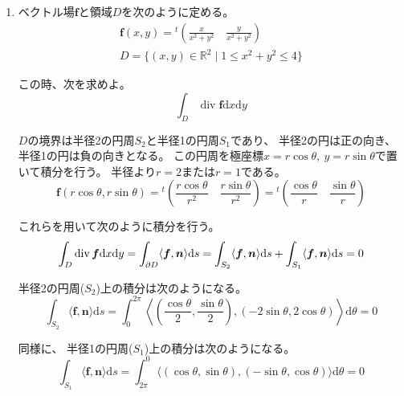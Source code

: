 \documentclass[12pt,b5paper]{ltjsarticle}
\newcommand{\Div}{\mathop{\mathrm{div}}\nolimits}
\begin{document}
\begin{enumerate}
 \item
      ベクトル場$\bm{f}$と領域$D$を次のように定める。
      \begin{gather}
       \bm{f}(x,y) = {}^{t}\left(\frac{x}{x^2+y^2} \quad  \frac{y}{x^2+y^2}\right)\\
       D = \{ (x,y)\in\mathbb{R}^2 \mid 1\leq  x^2+y^2\leq 4 \}
      \end{gather}

      この時、次を求めよ。
      \begin{equation}
       \int_D \Div\bm{f} \mathrm{d}x\mathrm{d}y
      \end{equation}

\dotfill

      $D$の境界は半径2の円周$S_2$と半径1の円周$S_1$であり、
      半径2の円は正の向き、半径1の円は負の向きとなる。
      この円周を極座標$x=r\cos\theta,\ y=r\sin\theta$で置いて積分を行う。
      半径より$r=2$または$r=1$である。
      \begin{equation}
       \bm{f}(r\cos\theta,r\sin\theta)
        = {}^{t}\left(\frac{r\cos\theta}{r^2} \quad  \frac{r\sin\theta}{r^2}\right)
        = {}^{t}\left(\frac{\cos\theta}{r} \quad  \frac{\sin\theta}{r}\right)
      \end{equation}

      これらを用いて次のように積分を行う。
      \begin{equation}
       \int_D \Div\bm{f} \mathrm{d}x\mathrm{d}y
       = \int_{\partial D} \langle \bm{f}, \bm{n} \rangle \mathrm{d}s
       = \int_{S_2} \langle \bm{f}, \bm{n} \rangle \mathrm{d}s
         + \int_{S_1} \langle \bm{f}, \bm{n} \rangle \mathrm{d}s\\
       =0
      \end{equation}

      半径2の円周($S_2$)上の積分は次のようになる。
      \begin{equation}
       \int_{S_2} \langle \bm{f}, \bm{n} \rangle \mathrm{d}s
        = \int_{0}^{2\pi} \left\langle \left(\frac{\cos\theta}{2}, \frac{\sin\theta}{2}\right),
        \left( -2\sin\theta, 2\cos\theta \right) \right\rangle \mathrm{d}\theta
        =0
      \end{equation}

      同様に、
      半径1の円周($S_1$)上の積分は次のようになる。
      \begin{equation}
       \int_{S_1} \langle \bm{f}, \bm{n} \rangle \mathrm{d}s
        = \int_{2\pi}^{0} \langle
            (\cos\theta, \sin\theta),(-\sin\theta, \cos\theta )
          \rangle \mathrm{d}\theta
        =0
      \end{equation}



\end{enumerate}
\end{document}
